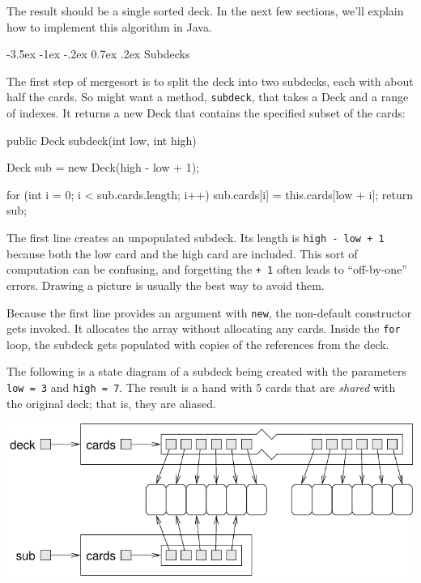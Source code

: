 \documentclass[12pt]{book}
\makeatletter
\theoremstyle{exercise}
\newcommand{\java}[1]{\verb"#1"}
\renewcommand{\section}{\@startsection{section}{1}{\z@}%
    {-3.5ex \@plus -1ex \@minus -.2ex}%
    {0.7ex \@plus.2ex}%
    {\normalfont\Large\bfseries}}
\newcommand{\java}[1]{\lstinline{#1}} %
\makeatother
\begin{document}
The result should be a single sorted deck.
In the next few sections, we'll explain how to implement this algorithm in Java.


\section{Subdecks}

The first step of mergesort is to split the deck into two subdecks, each with about half the cards.
So might want a method, \java{subdeck}, that takes a Deck and a range of indexes.
It returns a new Deck that contains the specified subset of the cards:

\begin{code}
public Deck subdeck(int low, int high) {
    Deck sub = new Deck(high - low + 1);

    for (int i = 0; i < sub.cards.length; i++) {
        sub.cards[i] = this.cards[low + i];
    }
    return sub;
}
\end{code}

The first line creates an unpopulated subdeck.
Its length is \java{high - low + 1} because both the low card and the high card are included.
This sort of computation can be confusing, and forgetting the \java{+ 1} often leads to ``off-by-one'' errors.
Drawing a picture is usually the best way to avoid them.


Because the first line provides an argument with \java{new}, the non-default constructor gets invoked.
It allocates the array without allocating any cards.
Inside the \java{for} loop, the subdeck gets populated with copies of the references from the deck.

The following is a state diagram of a subdeck being created with the parameters \java{low = 3} and \java{high = 7}.
The result is a hand with 5 cards that are {\em shared} with the original deck; that is, they are aliased.

\begin{center}
\includegraphics{figs/subdeck.pdf}
\end{center}
\end{document}
